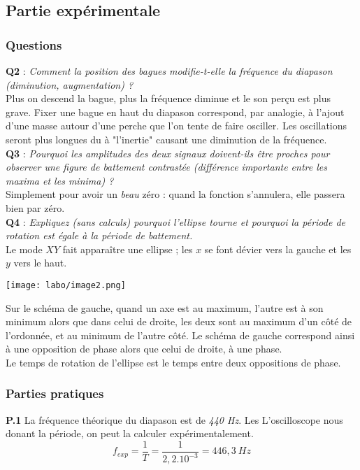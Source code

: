 \documentclass[british,french,11pt, a4paper, openany]{book}
\begin{document}
		\subsection{Partie expérimentale}
		\subsubsection{Questions}
		\textbf{Q2} : \textit{Comment la position des bagues modifie-t-elle la fréquence du diapason (diminution, augmentation) ?}\\
		Plus on descend la bague, plus la fréquence diminue et le son perçu est plus grave. Fixer une bague en haut du diapason correspond, par analogie, à l'ajout d'une masse autour d'une perche que l'on tente de faire osciller. Les oscillations seront plus longues du à "l'inertie" causant une diminution de la fréquence.\\
		
		\textbf{Q3} : \textit{Pourquoi les amplitudes des deux signaux doivent-ils être proches pour observer une figure de battement contrastée (différence importante entre les maxima et les minima) ?}\\
		Simplement pour avoir un \textit{beau} zéro : quand la fonction s'annulera, elle passera bien par zéro.\\
		
		\textbf{Q4} : \textit{Expliquez (sans calculs) pourquoi l'ellipse tourne et pourquoi la période de rotation est égale à la période de battement.}\\
		Le mode $XY$ fait apparaître une ellipse ; les $x$ se font dévier vers la gauche et les $y$ vers le haut.
		\begin{center}
			\texttt{[image: labo/image2.png]}
		\end{center}
		Sur le schéma de gauche, quand un axe est au maximum, l'autre est à son minimum alors que dans celui de droite, les deux sont au maximum d'un côté de l'ordonnée, et au minimum de l'autre côté. Le schéma de gauche correspond ainsi à une opposition de phase alors que celui de droite, à une phase. \\
		Le temps de rotation de l'ellipse est le temps entre deux oppositions de phase.
		
		\subsubsection*{Parties pratiques}
		\textbf{P.1} La fréquence théorique du diapason est de \textit{440 Hz}. Les L'oscilloscope nous donant la période, on peut la calculer expérimentalement.
		\begin{equation}
			f_{exp} = \frac{1}{T} = \frac{1}{2,2 . 10^{-3}} = 446,3\ Hz
		\end{equation}
		\ \\
		
\end{document}
